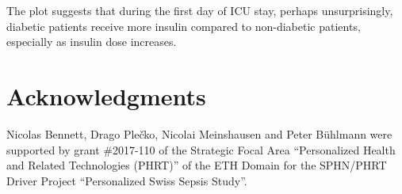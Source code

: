\documentclass[
  notitle]{jss}
\begin{document}
The plot suggests that during the first day of ICU stay, perhaps
unsurprisingly, diabetic patients receive more insulin compared to
non-diabetic patients, especially as insulin dose increases.

\hypertarget{acknowledgments}{%
\section{Acknowledgments}\label{acknowledgments}}

Nicolas Bennett, Drago Plečko, Nicolai Meinshausen and Peter Bühlmann
were supported by grant \#2017-110 of the Strategic Focal Area
``Personalized Health and Related Technologies (PHRT)'' of the ETH
Domain for the SPHN/PHRT Driver Project ``Personalized Swiss Sepsis
Study''.


\end{document}
